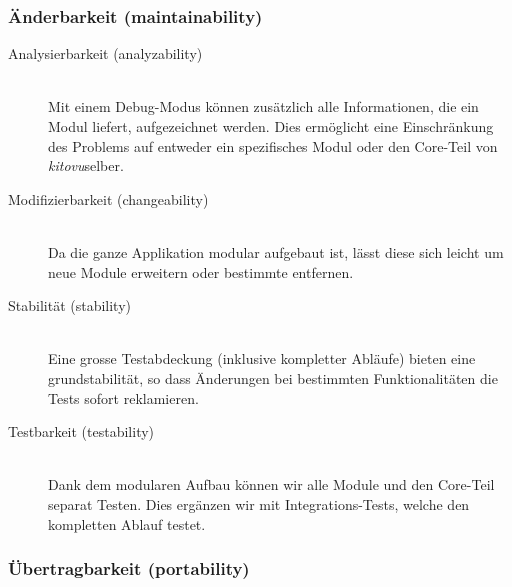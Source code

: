 \documentclass[a4paper]{article}
\begin{document}
\subsubsection{Änderbarkeit (maintainability)}

\begin{description}
  \item[Analysierbarkeit (analyzability)] \strut \\
    Mit einem Debug-Modus können zusätzlich alle Informationen, die ein Modul liefert, aufgezeichnet werden.
    Dies ermöglicht eine Einschränkung des Problems auf entweder ein spezifisches Modul oder den Core-Teil von \emph{kitovu}selber.
  \item[Modifizierbarkeit (changeability)] \strut \\
    Da die ganze Applikation modular aufgebaut ist, lässt diese sich leicht um neue Module erweitern oder bestimmte entfernen.
  \item[Stabilität (stability)] \strut \\
    Eine grosse Testabdeckung (inklusive kompletter Abläufe) bieten eine grundstabilität, so dass Änderungen bei bestimmten Funktionalitäten die Tests sofort reklamieren.
  \item[Testbarkeit (testability)] \strut \\
    Dank dem modularen Aufbau können wir alle Module und den Core-Teil separat Testen.
    Dies ergänzen wir mit Integrations-Tests, welche den kompletten Ablauf testet.
\end{description}

\subsubsection{Übertragbarkeit (portability)}
\end{document}
